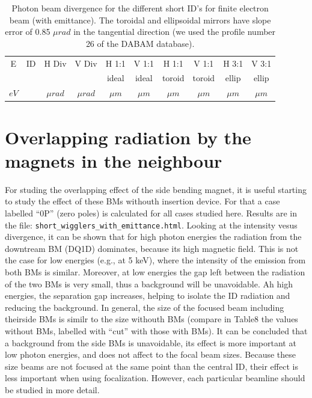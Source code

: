 \documentclass[a4paper,10pt]{article}
\begin{document}
% 
\begin{table}[H]
\label{tabledivergenceswithemittance}
\caption{Photon beam divergence for the different short ID's for finite electron beam (with emittance). The toroidal and 
ellipsoidal mirrors have slope error of 0.85 $\mu rad$ in the tangential direction (we used the profile number 26 of the 
DABAM database). 
}
\vspace{0.3cm}
\begin{tabular}{cc|cc|cc|cc|cc}      %
\hline
E       & ID  & H Div     &  V Div     & H 1:1            &  V 1:1   & H 1:1    &  V 1:1   & H 3:1     &  V 3:1      \\
        &     &           &            & ideal            &  ideal   & toroid   &  toroid  & ellip     &  ellip  \\
$eV$    &     & $\mu rad$ &  $\mu rad$ & $\mu m$          &  $\mu m$ & $\mu m$  &  $\mu m$ & $\mu m$   &  $\mu m$\\
\hline

\hline
\end{tabular}
\end{table}
% 

\section{Overlapping radiation by the magnets in the neighbour}
For studing the overlapping effect of the side bending magnet, it is useful starting to study the effect of these BMs withouth insertion device. 
For that a case labelled ``0P'' (zero poles) is calculated for all cases studied here. Results are in the file: {\tt short\_wigglers\_with\_emittance.html}.
Looking at the intensity vesus divergence, it can be shown that for high photon energies the radiation from the downtream BM (DQ1D) dominates, because
its high magnetic field. This is not the case for low energies (e.g., at 5 keV), where the intensity of the emission from both BMs is similar. 
Moreover, at low energies the gap left between the radiation of the two BMs is very small, thus a background will be unavoidable. Ah high energies, the
separation gap increases, helping to isolate the ID radiation and reducing the background. In general, the size of the focused beam including theirside BMs
is similr to the size withouth BMs (compare in Table8 the values without BMs, labelled with ``cut'' with those with BMs). It can be concluded that a 
background from the side BMs is unavoidable, its effect is more important at low photon energies, and does not affect to the focal beam sizes. Because these
size beams are not focused at the same point than the central ID, their effect is less important when using focalization. However, each particular beamline
should be studied in more detail. 



\end{document}
